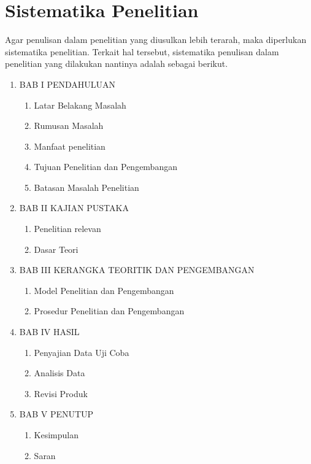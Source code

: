 \section{Sistematika Penelitian}

Agar penulisan dalam penelitian yang diusulkan lebih terarah,
maka diperlukan sistematika penelitian.
Terkait hal tersebut,
sistematika penulisan dalam penelitian yang dilakukan nantinya adalah sebagai berikut.

\begin{enumerate}[label=]

	\item BAB I PENDAHULUAN 
	\begin{enumerate}[label=\Alph*.]
		\item Latar Belakang Masalah
		\item Rumusan Masalah
		\item Manfaat penelitian
		\item Tujuan Penelitian dan Pengembangan
		\item Batasan Masalah Penelitian
	\end{enumerate}

	\item BAB II KAJIAN PUSTAKA 
	\begin{enumerate}[label=\Alph*.]
		\item Penelitian relevan
		\item Dasar Teori
	\end{enumerate}

	\item BAB III KERANGKA TEORITIK DAN PENGEMBANGAN 
	\begin{enumerate}[label=\Alph*.]
		\item Model Penelitian dan Pengembangan
		\item Prosedur Penelitian dan Pengembangan
	\end{enumerate}

	\item BAB IV HASIL 
	\begin{enumerate}[label=\Alph*.]
		\item Penyajian Data Uji Coba
		\item Analisis Data
		\item Revisi Produk
	\end{enumerate}

	\item BAB V PENUTUP 
	\begin{enumerate}[label=\Alph*.]
		\item Kesimpulan
		\item Saran
	\end{enumerate}

\end{enumerate}


